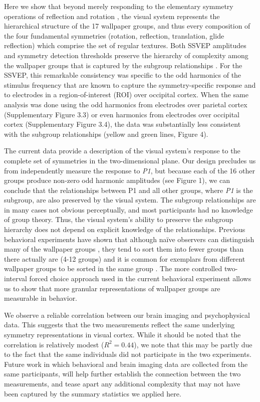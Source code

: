 \documentclass[11pt, twoside]{article}
\begin{document}
Here we show that beyond merely responding to the elementary symmetry operations of reflection \cite{RN1170} and rotation \cite{RN1725}, the visual system represents the hierarchical structure of the 17 wallpaper groups, and thus every composition of the four fundamental symmetries (rotation, reflection, translation, glide reflection) which comprise the set of regular textures. Both SSVEP amplitudes and symmetry detection thresholds preserve the hierarchy of complexity among the wallpaper groups that is captured by the subgroup relationships \cite{RN1711}. For the SSVEP, this remarkable consistency was specific to the odd harmonics of the stimulus frequency that are known to capture the symmetry-specific response \cite{RN1725} and to electrodes in a region-of-interest (ROI) over occipital cortex. When the same analysis was done using the odd harmonics from electrodes over parietal cortex (Supplementary Figure 3.3) or even harmonics from electrodes over occipital cortex (Supplementary Figure 3.4), the data was substantially less consistent with the subgroup relationships (yellow and green lines, Figure 4). 

The current data provide a description of the visual system’s response to the complete set of symmetries in the two-dimensional plane. Our design precludes us from independently measure the response to \textit{P1}, but because each of the 16 other groups produce non-zero odd harmonic amplitudes (see Figure 1), we can conclude that the relationships between P1 and all other groups, where \textit{P1} is the subgroup, are also preserved by the visual system. The subgroup relationships are in many cases not obvious perceptually, and most participants had no knowledge of group theory. Thus, the visual system’s ability to preserve the subgroup hierarchy does not depend on explicit knowledge of the relationships. Previous behavioral experiments have shown that although naïve observers can distinguish many of the wallpaper groups \cite{RN1253}, they tend to sort them into fewer groups than there actually are (4-12 groups) and it is common for exemplars from different wallpaper groups to be sorted in the same group \cite{RN172}. The more controlled two-interval forced choice approach used in the current behavioral experiment allows us to show that more granular representations of wallpaper groups are measurable in behavior. 

We observe a reliable correlation between our brain imaging and psychophysical data. This suggests that the two measurements reflect the same underlying symmetry representations in visual cortex. While it should be noted that the correlation is relatively modest ($R^2 = 0.44$), we note that this may be partly due to the fact that the same individuals did not participate in the two experiments. Future work in which behavioral and brain imaging data are collected from the same participants, will help further establish the connection between the two measurements, and tease apart any additional complexity that may not have been captured by the summary statistics we applied here. 
\end{document}
